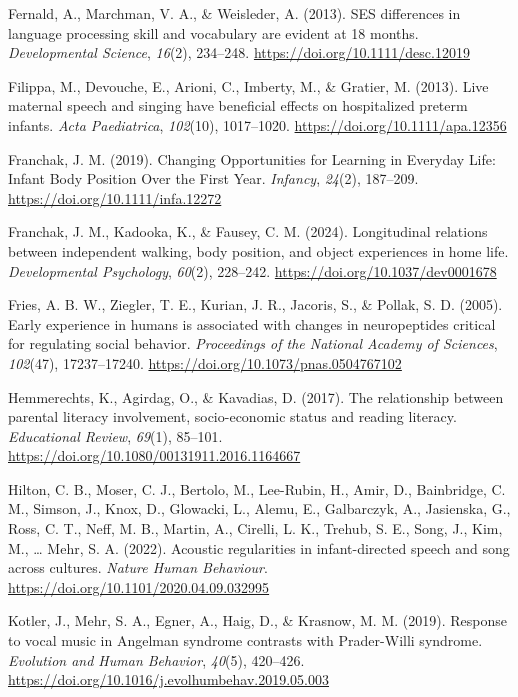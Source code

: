 \documentclass[
]{article}
\newlength{\cslhangindent}
\newenvironment{CSLReferences}[2] %
 {\begin{list}{}{%
  \setlength{\itemindent}{0pt}
  \setlength{\leftmargin}{0pt}
  \setlength{\parsep}{0pt}
  \ifodd #1
   \setlength{\leftmargin}{\cslhangindent}
   \setlength{\itemindent}{-1\cslhangindent}
  \fi
  \setlength{\itemsep}{#2\baselineskip}}}
 {\end{list}}
\begin{document}
\begin{CSLReferences}{1}{0}
Fernald, A., Marchman, V. A., \& Weisleder, A. (2013). {SES} differences
in language processing skill and vocabulary are evident at 18 months.
\emph{Developmental Science}, \emph{16}(2), 234--248.
\url{https://doi.org/10.1111/desc.12019}

Filippa, M., Devouche, E., Arioni, C., Imberty, M., \& Gratier, M.
(2013). Live maternal speech and singing have beneficial effects on
hospitalized preterm infants. \emph{Acta Paediatrica}, \emph{102}(10),
1017--1020. \url{https://doi.org/10.1111/apa.12356}

Franchak, J. M. (2019). Changing {Opportunities} for {Learning} in
{Everyday} {Life}: {Infant} {Body} {Position} {Over} the {First} {Year}.
\emph{Infancy}, \emph{24}(2), 187--209.
\url{https://doi.org/10.1111/infa.12272}

Franchak, J. M., Kadooka, K., \& Fausey, C. M. (2024). Longitudinal
relations between independent walking, body position, and object
experiences in home life. \emph{Developmental Psychology}, \emph{60}(2),
228--242. \url{https://doi.org/10.1037/dev0001678}

Fries, A. B. W., Ziegler, T. E., Kurian, J. R., Jacoris, S., \& Pollak,
S. D. (2005). Early experience in humans is associated with changes in
neuropeptides critical for regulating social behavior. \emph{Proceedings
of the National Academy of Sciences}, \emph{102}(47), 17237--17240.
\url{https://doi.org/10.1073/pnas.0504767102}

Hemmerechts, K., Agirdag, O., \& Kavadias, D. (2017). The relationship
between parental literacy involvement, socio-economic status and reading
literacy. \emph{Educational Review}, \emph{69}(1), 85--101.
\url{https://doi.org/10.1080/00131911.2016.1164667}

Hilton, C. B., Moser, C. J., Bertolo, M., Lee-Rubin, H., Amir, D.,
Bainbridge, C. M., Simson, J., Knox, D., Glowacki, L., Alemu, E.,
Galbarczyk, A., Jasienska, G., Ross, C. T., Neff, M. B., Martin, A.,
Cirelli, L. K., Trehub, S. E., Song, J., Kim, M., \ldots{} Mehr, S. A.
(2022). Acoustic regularities in infant-directed speech and song across
cultures. \emph{Nature Human Behaviour}.
\url{https://doi.org/10.1101/2020.04.09.032995}

Kotler, J., Mehr, S. A., Egner, A., Haig, D., \& Krasnow, M. M. (2019).
Response to vocal music in {Angelman} syndrome contrasts with
{Prader}-{Willi} syndrome. \emph{Evolution and Human Behavior},
\emph{40}(5), 420--426.
\url{https://doi.org/10.1016/j.evolhumbehav.2019.05.003}


\end{CSLReferences}
\end{document}
